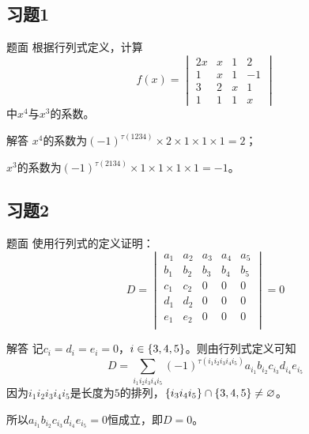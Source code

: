 \documentclass[9pt,xcolor=svgnames]{beamer} %
\begin{document}
\subsection*{习题1}
\begin{frame}
    \begin{block}{题面}
        根据行列式定义，计算
        \begin{equation*}
            f(x)=
            \begin{vmatrix}
                2x & x & 1 & 2  \\
                1  & x & 1 & -1 \\
                3  & 2 & x & 1  \\
                1  & 1 & 1 & x
            \end{vmatrix}
        \end{equation*}
        中\(x^4\)与\(x^3\)的系数。
    \end{block}
    \pause
    \begin{block}{解答}
        \(x^4\)的系数为\((-1)^{\tau(1234)}\times2\times1\times1\times1=2\)；

        \(x^3\)的系数为\((-1)^{\tau(2134)}\times1\times1\times1\times1=-1\)。
    \end{block}
\end{frame}

\subsection*{习题2}
\begin{frame}{题面}
    使用行列式的定义证明：
    \begin{equation*}
        D=
        \begin{vmatrix}
            a_1 & a_2 & a_3 & a_4 & a_5 \\
            b_1 & b_2 & b_3 & b_4 & b_5 \\
            c_1 & c_2 & 0   & 0   & 0   \\
            d_1 & d_2 & 0   & 0   & 0   \\
            e_1 & e_2 & 0   & 0   & 0   \\
        \end{vmatrix}=0
    \end{equation*}
\end{frame}
\begin{frame}{解答}
    记\(c_i=d_i=e_i=0\)，\(i\in\left\{3,4,5 \right\}\)。则由行列式定义可知
    \begin{equation*}
        D=\sum_{i_1i_2i_3i_4i_5}(-1)^{\tau(i_1i_2i_3i_4i_5)}a_{i_1}b_{i_2}c_{i_3}d_{i_4}e_{i_5}
    \end{equation*}
    因为\(i_1i_2i_3i_4i_5\)是长度为\(5\)的排列，\(\left\{i_3i_4i_5 \right\}\cap\left\{3,4,5 \right\}\neq\varnothing\)。

    所以\(a_{i_1}b_{i_2}c_{i_3}d_{i_4}e_{i_5}=0\)恒成立，即\(D=0\)。
\end{frame}
\end{document}
